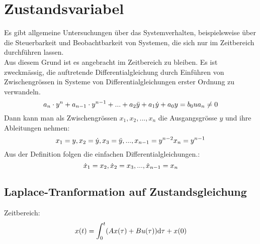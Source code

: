



\section{Zustandsvariabel}
Es gibt allgemeine Untersuchungen über das Systemverhalten, beispielsweise über die Steuerbarkeit und Beobachtbarkeit von Systemen, die sich nur im Zeitbereich durchführen lassen.\\
Aus diesem Grund ist es angebracht im Zeitbereich zu bleiben. Es ist zweckmässig, die auftretende Differentialgleichung durch Einführen von Zwischengrössen in Systeme von Differentialgleichungen erster Ordnung zu verwandeln.
\[
	a_n\cdot y^n+a_{n-1} \cdot y^{n-1}+...+a_2\ddot{y} +a_1\dot{y}+ a_0y=b_0u 
	\\ a_n\neq 0
\]
Dann kann man als Zwischengrössen $x_1,x_2,...,x_n$ die Ausgangsgrösse $y$ und ihre Ableitungen nehmen:
\[
	x_1=y,	\\	x_2=\dot{y},	\\ x_3=\ddot{y},...,	\\x_{n-1}=y^{n-2}	\\	x_n=y^{n-1}
\]
Aus der Definition folgen die einfachen Differentialgleichungen.:
\[
	\dot{x}_1=x_2,	\\	\dot{x}_2=x_3	\\,...,	\\ 	\dot{x}_{n-1}=x_n
\]

\subsection{Laplace-Tranformation auf Zustandsgleichung}
Zeitbereich:
\[
	x(t) = \int_{0}^{t}(Ax(\tau)+Bu(\tau))\mathrm{d}\tau + x(0)
\]

